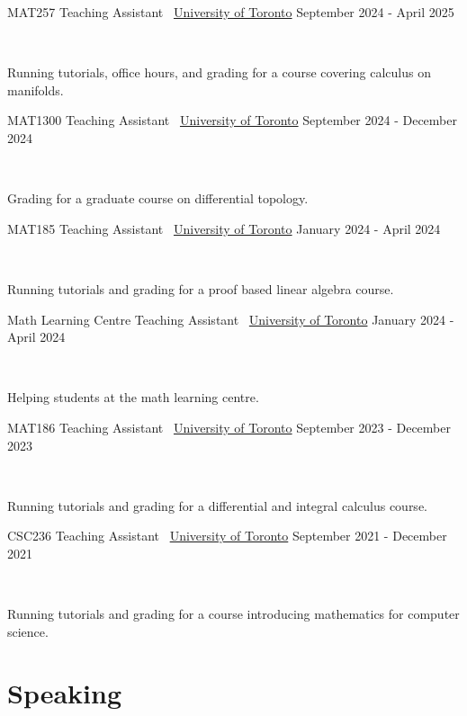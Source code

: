 \documentclass[]{style}
\begin{document}
\begin{entrylist}

\vspace{1mm}

\entry
{MAT257 Teaching Assistant \ {\normalfont \underline{University of Toronto}}}
{September  2024 - April 2025}
{ ~ \vspace{-2.5mm}

Running tutorials, office hours, and grading for a course covering calculus on manifolds. 
}

\entry
{MAT1300 Teaching Assistant \ {\normalfont \underline{University of Toronto}}}
{September  2024 - December 2024}
{ ~ \vspace{-2.5mm}

Grading for a graduate course on differential topology.
}

\entry
{MAT185 Teaching Assistant \ {\normalfont \underline{University of Toronto}}}
{January  2024 - April 2024}
{ ~ \vspace{-2.5mm}

Running tutorials and grading for a proof based linear algebra course.
}

\entry
{Math Learning Centre Teaching Assistant \ {\normalfont \underline{University of Toronto}}}
{January  2024 - April 2024}
{ ~ \vspace{-2.5mm}

Helping students at the math learning centre.
}

\end{entrylist}

\newpage

\begin{entrylist}

\entry
{MAT186 Teaching Assistant \ {\normalfont \underline{University of Toronto}}}
{September 2023 - December 2023}
{ ~ \vspace{-2.5mm}

Running tutorials and grading for a differential and integral calculus course.
}


\entry
{CSC236 Teaching Assistant \ {\normalfont \underline{University of Toronto}}}
{September 2021 - December 2021}
{ ~ \vspace{-2.5mm}

Running tutorials and grading for a course introducing mathematics for computer science.
}

\end{entrylist}


\section{Speaking}
\end{document}
